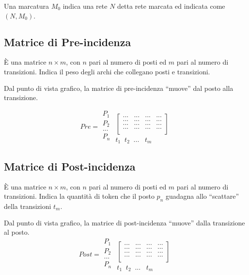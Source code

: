 \documentclass[a4paper]{report}
\begin{document}
Una marcatura $M_0$ indica una rete $N$ detta rete marcata ed indicata
come $(N,M_0)$.

\subsection{Matrice di Pre-incidenza}
\`E una matrice $n \times m$, con $n$ pari al numero di posti ed $m$
pari al numero di transizioni. Indica il peso degli archi che
collegano posti e transizioni. 

Dal punto di vista grafico, la matrice di pre-incidenza ``muove''
dal posto alla transizione.

\[
Pre =
\begin{array}{c}
  P_1\\
  P_2\\
  ...\\
  P_n\\
  
\end{array}
\begin{array}{cc}
  \\
 \begin{bmatrix}
   ... & ... & ... & ... \\
   ... & ... & ... & ... \\
   ... & ... & ... & ... \\
   ... & ... & ... & ... \\
 \end{bmatrix}\\
  t_1\;\;t_2\;\;...\;\;\;t_m
\end{array}
\]

\subsection{Matrice di Post-incidenza}
\`E una matrice $n \times m$, con $n$ pari al numero di posti ed $m$
pari al numero di transizioni. Indica la quantit\`a di token che il
posto $p_n$ guadagna allo ``scattare'' della transizioni $t_m$.

Dal punto di vista grafico, la matrice di post-incidenza ``muove''
dalla transizione al posto.
\[
Post =
\begin{array}{c}
  P_1\\
  P_2\\
  ...\\
  P_n\\
  
\end{array}
\begin{array}{cc}
  \\
 \begin{bmatrix}
   ... & ... & ... & ... \\
   ... & ... & ... & ... \\
   ... & ... & ... & ... \\
   ... & ... & ... & ... \\
 \end{bmatrix}\\
  t_1\;\;t_2\;\;...\;\;\;t_m
\end{array}
\]
\end{document}

